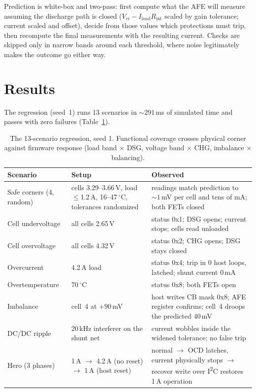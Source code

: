 \documentclass[11pt]{article}
\newcommand{\iic}{I\textsuperscript{2}C}
\begin{document}
Prediction is white-box and two-pass: first compute what the AFE will
measure assuming the discharge path is closed
($V_{ci} - I_{\mathrm{load}}R_{\mathrm{int}}$ scaled by gain
tolerance; current scaled and offset), decide from those values which
protections must trip, then recompute the final measurements with the
resulting current.  Checks are skipped only in narrow bands around
each threshold, where noise legitimately makes the outcome go either
way.

\section{Results}

The regression (seed~1) runs 13 scenarios in ${\sim}291$\,ms of
simulated time and passes with zero failures
(Table~\ref{tab:results}).

\begin{table}[htbp]
\centering\small
\begin{tabular}{@{}p{34mm}p{44mm}p{62mm}@{}}
\toprule
Scenario & Setup & Observed \\
\midrule
Safe corners (4, random) & cells 3.29--3.66\,V, load $\le$1.2\,A,
  16--47\,$^\circ$C, tolerances randomized &
  readings match prediction to ${\sim}1$\,mV per cell and tens of mA;
  both FETs closed \\
Cell undervoltage & all cells 2.65\,V &
  status 0x1; DSG opens; current stops; cells read unloaded \\
Cell overvoltage & all cells 4.32\,V &
  status 0x2; CHG opens; DSG stays closed \\
Overcurrent & 4.2\,A load &
  status 0x4; trip in 0 host loops, latched; shunt current 0\,mA \\
Overtemperature & 70\,$^\circ$C &
  status 0x8; both FETs open \\
Imbalance & cell~4 at $+90$\,mV &
  host writes CB mask 0x8; AFE register confirms; cell~4 droops the
  predicted 40\,mV \\
DC/DC ripple & 20\,kHz interferer on the shunt net &
  current wobbles inside the widened tolerance; no false trip \\
Hero (3 phases) & 1\,A $\to$ 4.2\,A (no reset) $\to$ 1\,A (host reset) &
  normal $\to$ OCD latches, current physically stops $\to$ recover
  write over \iic{} restores 1\,A operation \\
\bottomrule
\end{tabular}
\caption{The 13-scenario regression, seed 1.  Functional coverage
crosses physical corner against firmware response (load band $\times$
DSG, voltage band $\times$ CHG, imbalance $\times$ balancing).}
\label{tab:results}
\end{table}
\end{document}
